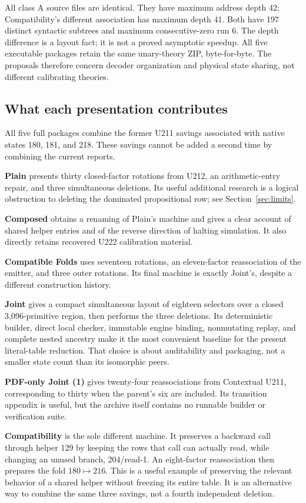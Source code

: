 \documentclass[11pt,letterpaper]{article}
\begin{document}
All class A source files are identical. They have maximum address depth 42;
Compatibility's different association has maximum depth 41. Both have
197 distinct syntactic subtrees and maximum consecutive-zero run 6. The
depth difference is a layout fact; it is not a proved asymptotic speedup.
All five executable packages retain the same unary-theory ZIP, byte-for-byte. The proposals
therefore concern decoder organization and physical state sharing, not
different calibrating theories.

\subsection{What each presentation contributes}

All five full packages combine the former U211 savings associated with
native states 180, 181, and 218. These savings cannot be added a second time
by combining the current reports.

\textbf{Plain} presents thirty closed-factor rotations from U212, an
arithmetic-entry repair, and three simultaneous deletions. Its useful
additional research is a logical obstruction to deleting the dominated
propositional row; see Section~\ref{sec:limits}.

\textbf{Composed} obtains a renaming of Plain's machine and gives a clear
account of shared helper entries and of the reverse direction of halting
simulation. It also directly retains recovered U222 calibration material.

\textbf{Compatible Folds} uses seventeen rotations, an eleven-factor
reassociation of the emitter, and three outer rotations. Its final machine
is exactly Joint's, despite a different construction history.

\textbf{Joint} gives a compact simultaneous layout of eighteen selectors
over a closed 3,096-primitive region, then performs the three deletions.
Its deterministic builder, direct local checker, immutable engine binding,
nonmutating replay, and complete nested ancestry make it the most convenient
baseline for the present literal-table reduction. That choice is about
auditability and packaging, not a smaller state count than its isomorphic peers.

\textbf{PDF-only Joint (1)} gives twenty-four reassociations from Contextual
U211, corresponding to thirty when the parent's six are included. Its
transition appendix is useful, but the archive itself contains no runnable
builder or verification suite.

\textbf{Compatibility} is the sole different machine. It preserves a
backward call through helper 129 by keeping the rows that call can actually
read, while changing an unused branch, 204/read-1. An eight-factor
reassociation then prepares the fold \(180\mapsto216\). This is a useful
example of preserving the relevant behavior of a shared helper without
freezing its entire table. It is an alternative way to combine the same
three savings, not a fourth independent deletion.
\end{document}
